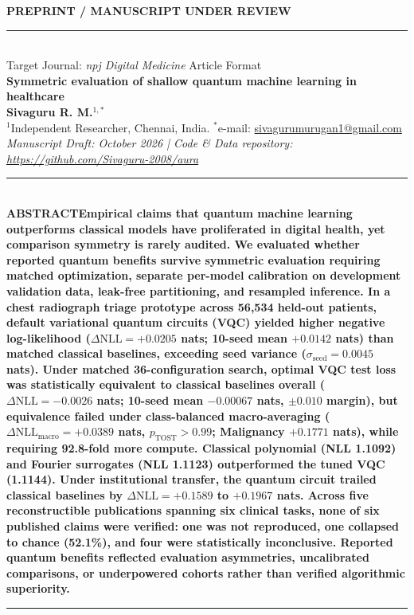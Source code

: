\documentclass[10pt,a4paper,twoside]{article}
\begin{document}
\thispagestyle{firstpage}

 \hfill {\large\textbf{\textsf{PREPRINT / MANUSCRIPT UNDER REVIEW}}}\\[2pt]
\rule{\textwidth}{1.2pt}\\[3pt]
{\footnotesize\textsf{Target Journal: \textit{npj Digital Medicine}}} \hfill {\footnotesize\textsf{\color{naturegray}Article Format}}\\[14pt]

{\LARGE\textbf{\textsf{Symmetric evaluation of shallow quantum machine learning in healthcare}}}\\[12pt]

{\large\textbf{\textsf{Sivaguru R. M.}}$^{1,*}$}\\[6pt]

{\footnotesize $^{1}$Independent Researcher, Chennai, India. $^*$e-mail: \href{mailto:sivagurumurugan1@gmail.com}{sivagurumurugan1@gmail.com}}\\[4pt]
{\footnotesize\textit{Manuscript Draft: October 2026 | Code \& Data repository: \url{https://github.com/Sivaguru-2008/aura}}}\\[10pt]

\noindent\rule{\textwidth}{0.4pt}\\[6pt]
\noindent\textbf{\textsf{ABSTRACT}}\quad\textbf{Empirical claims that quantum machine learning outperforms classical models have proliferated in digital health, yet comparison symmetry is rarely audited. We evaluated whether reported quantum benefits survive symmetric evaluation requiring matched optimization, separate per-model calibration on development validation data, leak-free partitioning, and resampled inference. In a chest radiograph triage prototype across 56,534 held-out patients, default variational quantum circuits (VQC) yielded higher negative log-likelihood ($\Delta\text{NLL} = +0.0205$ nats; 10-seed mean $+0.0142$ nats) than matched classical baselines, exceeding seed variance ($\sigma_{\text{seed}} = 0.0045$ nats). Under matched 36-configuration search, optimal VQC test loss was statistically equivalent to classical baselines overall ($\Delta\text{NLL} = -0.0026$ nats; 10-seed mean $-0.00067$ nats, $\pm 0.010$ margin), but equivalence failed under class-balanced macro-averaging ($\Delta\text{NLL}_{\text{macro}} = +0.0389$ nats, $p_{\text{TOST}} > 0.99$; Malignancy $+0.1771$ nats), while requiring 92.8-fold more compute. Classical polynomial (NLL 1.1092) and Fourier surrogates (NLL 1.1123) outperformed the tuned VQC (1.1144). Under institutional transfer, the quantum circuit trailed classical baselines by $\Delta\text{NLL} = +0.1589$ to $+0.1967$ nats. Across five reconstructible publications spanning six clinical tasks, none of six published claims were verified: one was not reproduced, one collapsed to chance (52.1\%), and four were statistically inconclusive. Reported quantum benefits reflected evaluation asymmetries, uncalibrated comparisons, or underpowered cohorts rather than verified algorithmic superiority.}\\[6pt]
\noindent\rule{\textwidth}{0.4pt}
\vspace{10pt}
\end{document}
